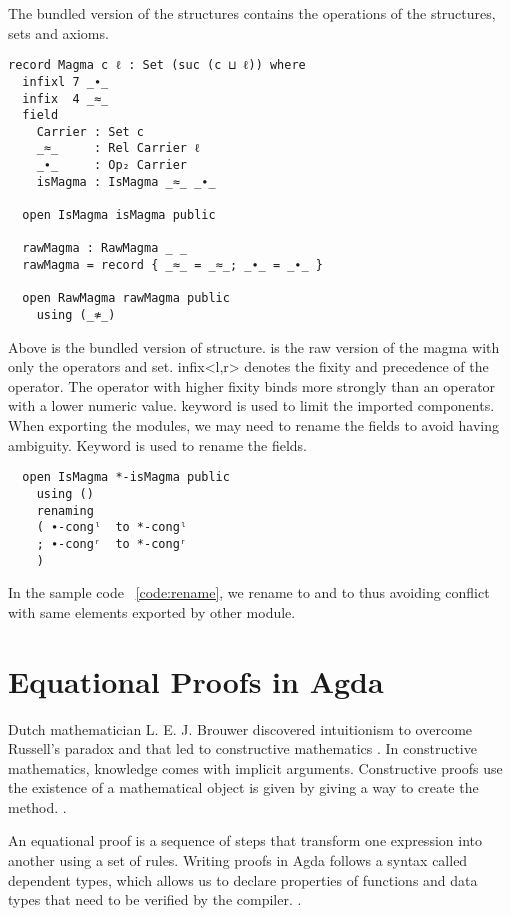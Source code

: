 The bundled version of the structures contains the operations of the structures,
sets and axioms. 
\begin{verbatim}
record Magma c ℓ : Set (suc (c ⊔ ℓ)) where
  infixl 7 _∙_
  infix  4 _≈_
  field
    Carrier : Set c
    _≈_     : Rel Carrier ℓ
    _∙_     : Op₂ Carrier
    isMagma : IsMagma _≈_ _∙_

  open IsMagma isMagma public

  rawMagma : RawMagma _ _
  rawMagma = record { _≈_ = _≈_; _∙_ = _∙_ }

  open RawMagma rawMagma public
    using (_≉_)
\end{verbatim}
Above is the bundled version of  structure.  is
the raw version of the magma with only the operators and set. infix<l,r> denotes
the fixity and precedence of the operator. The operator with higher fixity binds
more strongly than an operator with a lower numeric value. 
keyword is used to limit the imported components. When exporting the modules, we
may need to rename the fields to avoid having ambiguity. Keyword
 is used to rename the fields.
\label{code:rename}
\begin{verbatim}
  open IsMagma *-isMagma public
    using ()
    renaming
    ( ∙-congˡ  to *-congˡ
    ; ∙-congʳ  to *-congʳ
    )
\end{verbatim} 
In the sample code ~\ref{code:rename}, we rename   to 
and   to  thus avoiding conflict with same
elements exported by other module.

\section{Equational Proofs in Agda}
Dutch mathematician L. E. J. Brouwer discovered intuitionism to overcome
Russell's paradox and that led to constructive mathematics
\cite{enwiki:1122615242}. In constructive mathematics, knowledge comes with
implicit arguments. Constructive proofs use the existence of a mathematical
object is given by giving a way to create the method. \cite{enwiki:1090644431}. 

An equational proof is a sequence of steps that transform one expression into
another using a set of rules. Writing proofs in Agda follows a syntax called
dependent types, which allows us to declare properties of functions and data
types that need to be verified by the compiler. \cite{kidney2020finiteness}.  

